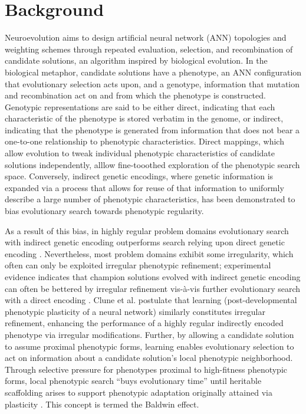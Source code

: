 \section{Background}

Neuroevolution aims to design artificial neural network (ANN) topologies and weighting schemes through repeated evaluation, selection, and recombination of candidate solutions, an algorithm inspired by biological evolution. In the biological metaphor, candidate solutions have a phenotype, an ANN configuration that evolutionary selection acts upon, and a genotype, information that mutation and recombination act on and from which the phenotype is constructed. Genotypic representations are said to be either direct, indicating that each characteristic of the phenotype is stored verbatim in the genome, or indirect, indicating that the phenotype is generated from information that does not bear a one-to-one relationship to phenotypic characteristics. Direct mappings, which allow evolution to tweak individual phenotypic characteristics of candidate solutions independently, alllow fine-tooothed exploration of the phenotypic search space. Conversely, indirect genetic encodings, where genetic information is expanded via a process that allows for reuse of that information to uniformly describe a large number of phenotypic characteristics, has been demonstrated to bias evolutionary search towards phenotypic regularity\autocite{Clune2011OnRegularity}.

As a result of this bias, in highly regular problem domains evolutionary search with indirect genetic encoding outperforms search relying upon direct genetic encoding \autocite{Clune2011OnRegularity}. Nevertheless, most problem domains exhibit some irregularity, which often can only be exploited irregular phenotypic refinement; experimental evidence indicates that champion solutions evolved with indirect genetic encoding can often be bettered by irregular refinement vis-\`a-vis further evolutionary search with a direct encoding \autocite{Clune2011OnRegularity}. Clune et al. postulate that learning (post-developmental phenotypic plasticity of a neural network) similarly constitutes irregular refinement, enhancing the performance of a highly regular indirectly encoded phenotype via irregular modifications. Further, by allowing a candidate solution to assume proximal phenotypic forms, learning enables evolutionary selection to act on information about a candidate solution's local phenotypic neighborhood. Through selective pressure for phenotypes proximal to high-fitness phenotypic forms, local phenotypic search ``buys evolutionary time'' until heritable scaffolding arises to support phenotypic adaptation originally attained via plasticity \autocite{Downing2010TheNetworks}. This concept is termed the Baldwin effect.